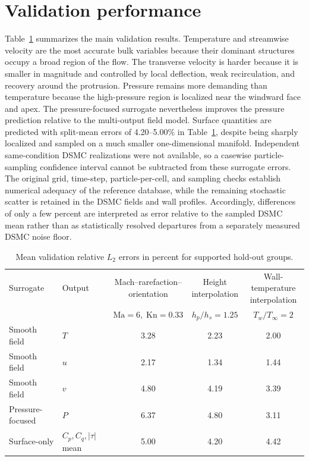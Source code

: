 \documentclass[aip,pof,preprint,floatfix,amsmath,amssymb]{revtex4-2}
\newcommand{\Kn}{\mathrm{Kn}}
\newcommand{\Ma}{\mathrm{Ma}}
\begin{document}
\section{Validation performance}
Table~\ref{tab:validation} summarizes the main validation results. Temperature and streamwise velocity are the most accurate bulk variables because their dominant structures occupy a broad region of the flow. The transverse velocity is harder because it is smaller in magnitude and controlled by local deflection, weak recirculation, and recovery around the protrusion. Pressure remains more demanding than temperature because the high-pressure region is localized near the windward face and apex. The pressure-focused surrogate nevertheless improves the pressure prediction relative to the multi-output field model. Surface quantities are predicted with split-mean errors of 4.20--5.00\% in Table~\ref{tab:validation}, despite being sharply localized and sampled on a much smaller one-dimensional manifold. Independent same-condition DSMC realizations were not available, so a casewise particle-sampling confidence interval cannot be subtracted from these surrogate errors. The original grid, time-step, particle-per-cell, and sampling checks establish numerical adequacy of the reference database, while the remaining stochastic scatter is retained in the DSMC fields and wall profiles. Accordingly, differences of only a few percent are interpreted as error relative to the sampled DSMC mean rather than as statistically resolved departures from a separately measured DSMC noise floor.

\begin{table}[t]
\centering
\caption{Mean validation relative $L_2$ errors in percent for supported hold-out groups.}
\label{tab:validation}
\footnotesize
\begin{tabular}{llccc}
\toprule
Surrogate & Output & \shortstack{Mach--rarefaction--\\orientation} & \shortstack{Height\\interpolation} & \shortstack{Wall-temperature\\interpolation} \\
 & & $\Ma=6,\;\Kn=0.33$ & $h_p/h_s=1.25$ & $T_w/T_\infty=2$ \\
\midrule
Smooth field & $T$ & 3.28 & 2.23 & 2.00 \\
Smooth field & $u$ & 2.17 & 1.34 & 1.44 \\
Smooth field & $v$ & 4.80 & 4.19 & 3.39 \\
Pressure-focused & $P$ & 6.37 & 4.80 & 3.11 \\
Surface-only & $C_p,C_q,|\tau|$ mean & 5.00 & 4.20 & 4.42 \\
\bottomrule
\end{tabular}
\end{table}
\end{document}
